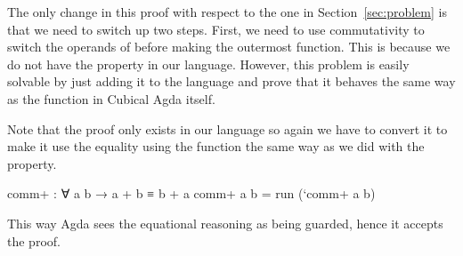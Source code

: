 The only change in this proof with respect to the one in Section~\ref{sec:problem} is that
we need to switch up two steps. First, we need to use commutativity to switch the
operands of \AgdaFunction{\_+\_} before making  the outermost function.
This is because we do not have the  property in our language.
However, this problem is easily solvable by just adding it to the language and
prove that it behaves the same way as the  function in Cubical Agda itself.

Note that the proof only exists in our language so again we have to convert
it to make it use the equality using the  function the same
way as we did with the  property.

\begin{code}
comm+ : ∀ a b → a + b ≡ b + a
comm+ a b = run (`comm+ a b)
\end{code}

This way Agda sees the equational reasoning as being guarded, hence it accepts the proof.
